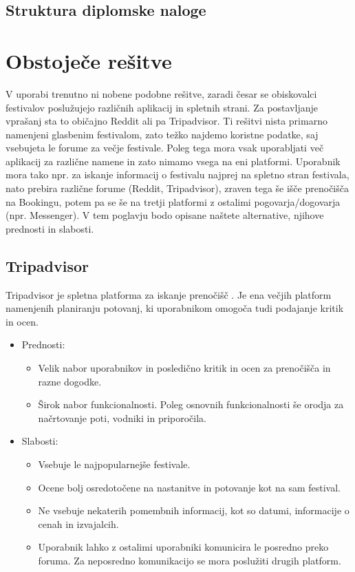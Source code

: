 \documentclass[a4paper,12pt,openright]{book}
\begin{document}
\section{Struktura diplomske naloge}



\chapter{Obstoječe rešitve}
V uporabi trenutno ni nobene podobne rešitve, zaradi česar se obiskovalci festivalov poslužujejo različnih aplikacij in spletnih strani. 
Za postavljanje vprašanj sta to običajno Reddit ali pa Tripadvisor. Ti rešitvi nista primarno namenjeni glasbenim festivalom, 
zato težko najdemo koristne podatke, saj vsebujeta le forume za večje festivale.
Poleg tega mora vsak uporabljati več aplikacij za različne namene in zato nimamo vsega na eni platformi. Uporabnik mora tako npr. za iskanje informacij o festivalu najprej na spletno stran festivala,
nato prebira različne forume (Reddit, Tripadvisor), zraven tega še išče prenočišča na Bookingu, potem pa se še na tretji platformi z ostalimi pogovarja/dogovarja (npr. Messenger).
V tem poglavju bodo opisane naštete alternative, njihove prednosti in slabosti.

\section{Tripadvisor}
Tripadvisor je spletna platforma za iskanje prenočišč \cite{tripadvisor}. Je ena večjih platform namenjenih planiranju potovanj, ki uporabnikom omogoča tudi podajanje kritik in ocen.

\begin{itemize}
    \item Prednosti:
        \begin{itemize}
            \item Velik nabor uporabnikov in posledično kritik in ocen za prenočišča in razne dogodke.
            \item Širok nabor funkcionalnosti. Poleg osnovnih funkcionalnosti še orodja za načrtovanje poti, vodniki in priporočila.
        \end{itemize}
    \item Slabosti:
        \begin{itemize}
            \item Vsebuje le najpopularnejše festivale.
            \item Ocene bolj osredotočene na nastanitve in potovanje kot na sam festival.
            \item Ne vsebuje nekaterih pomembnih informacij, kot so datumi, informacije o cenah in izvajalcih.
            \item Uporabnik lahko z ostalimi uporabniki komunicira le posredno preko foruma. Za neposredno komunikacijo se mora poslužiti drugih platform.
        \end{itemize}
\end{itemize}
\end{document}
